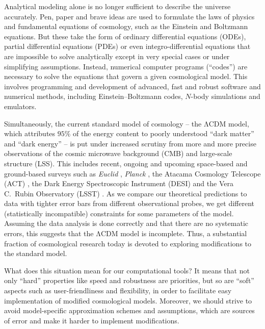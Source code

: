 \documentclass[USenglish, thumbmarks]{uiophdthesis} %
\newcommand\LCDM{\ensuremath{\mathrm{\Lambda CDM}}}
\newcommand\EB{Einstein--Boltzmann}
\begin{document}
Analytical modeling alone is no longer sufficient to describe the universe accurately.
Pen, paper and brave ideas are used to formulate the laws of physics and fundamental equations of cosmology,
such as the Einstein and Boltzmann equations.
But these take the form of ordinary differential equations (ODEs),
partial differential equations (PDEs) or even integro-differential equations
that are impossible to solve analytically except in very special cases or under simplifying assumptions.
Instead, numerical computer programs (\enquote{codes}) are necessary to solve the equations that govern a given cosmological model.
This involves programming and development of advanced, fast and robust software and numerical methods,
including \EB{} codes, $N$-body simulations and emulators.

Simultaneously, the current standard model of cosmology
-- the \LCDM{} model, which attributes $95\%$ of the energy content to poorly understood \enquote{dark matter} and \enquote{dark energy} --
is put under increased scrutiny from more and more precise observations of the cosmic microwave background (CMB) and large-scale structure (LSS).
This includes recent, ongoing and upcoming space-based and ground-based surveys such as
\textit{Euclid} \cite{collaborationEuclidOverviewEuclid2025},
\textit{Planck} \cite{collaborationPlanck2018Results2020,planck18parameters},
the Atacama Cosmology Telescope (ACT) \cite{louisAtacamaCosmologyTelescope2025},
the Dark Energy Spectroscopic Instrument (DESI) \cite{collaborationDESIExperimentPart2016,collaborationDESIDR2Results2025} and
the Vera C.~Rubin Observatory (LSST) \cite{ivezicLSSTScienceDrivers2019}.
As we compare our theoretical predictions to data with tighter error bars from different observational probes,
we get different (statistically incompatible) constraints for some parameters of the model.
Assuming the data analysis is done correctly and that there are no systematic errors,
this suggests that the \LCDM{} model is incomplete.
Thus, a substantial fraction of cosmological research today
is devoted to exploring modifications to the standard model.

What does this situation mean for our computational tools?
It means that not only \enquote{hard} properties like speed and robustness are priorities,
but so are \enquote{soft} aspects such as user-friendliness and flexibility,
in order to facilitate easy implementation of modified cosmological models.
Moreover, we should strive to avoid model-specific approximation schemes and assumptions,
which are sources of error and make it harder to implement modifications.
\end{document}

